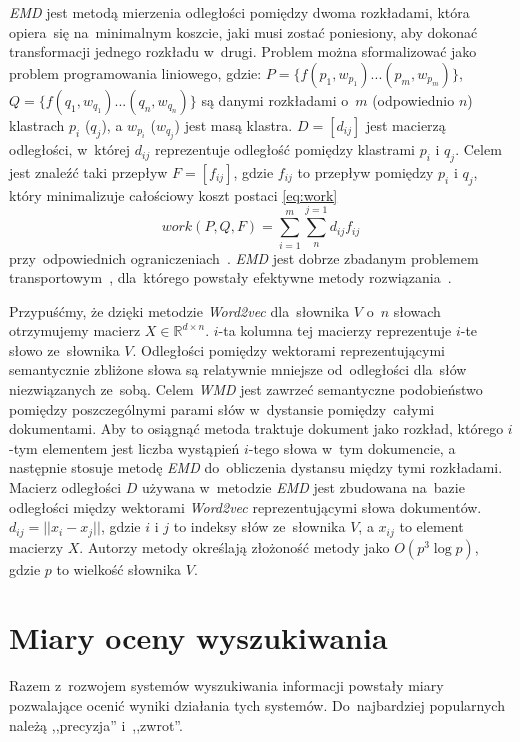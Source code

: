\documentclass[pl]{minipw} %
\begin{document}
\textit{EMD} jest metodą mierzenia odległości pomiędzy dwoma rozkładami, która opiera~się na~minimalnym koszcie, jaki musi zostać poniesiony, aby dokonać transformacji jednego rozkładu w~drugi. Problem można sformalizować jako problem programowania liniowego, gdzie:
$P=\{f(p_1,w_{p_1})...(p_m,w_{p_m})\}$, $Q=\{f(q_1,w_{q_1})...(q_n,w_{q_n})\}$ są danymi rozkładami o~$m$ (odpowiednio $n$) klastrach $p_i$ ($q_j$), a $w_{p_i}$ ($w_{q_j}$) jest masą klastra. $D=[d_{ij}]$ jest macierzą odległości, w~której $d_{ij}$ reprezentuje odległość pomiędzy klastrami $p_i$ i $q_j$. Celem jest znaleźć taki przepływ $F = [f_{ij}]$, gdzie $f_{ij}$ to przepływ pomiędzy $p_i$ i $q_j$, który minimalizuje całościowy koszt postaci \ref{eq:work}
\begin{equation}
\label{eq:work}
work(P, Q, F) = \sum_{i=1}^{m}\sum_{n}^{j=1}d_{ij}f_{ij}
\end{equation}
przy~odpowiednich ograniczeniach~\cite{emd}.
\textit{EMD} jest dobrze zbadanym problemem transportowym~\cite{emd}, dla~którego powstały efektywne metody rozwiązania~\cite{emd_method}. 

Przypuśćmy, że dzięki metodzie \textit{Word2vec} dla~słownika $V$ o~$n$ słowach otrzymujemy macierz $X \in \mathbb{R}^{d \times n}$. $i$-ta kolumna tej macierzy reprezentuje $i$-te słowo ze~słownika $V$. Odległości pomiędzy wektorami reprezentującymi semantycznie zbliżone słowa są relatywnie mniejsze od~odległości dla~słów niezwiązanych ze~sobą. Celem \textit{WMD} jest zawrzeć semantyczne podobieństwo pomiędzy poszczególnymi parami słów w~dystansie pomiędzy~całymi dokumentami. Aby to osiągnąć metoda traktuje dokument jako rozkład, którego $i$-tym elementem jest liczba wystąpień $i$-tego słowa w~tym dokumencie, a następnie stosuje metodę \textit{EMD} do~obliczenia dystansu między tymi rozkładami. Macierz odległości $D$ używana w~metodzie \textit{EMD} jest zbudowana na~bazie odległości między wektorami \textit{Word2vec} reprezentującymi słowa dokumentów. $d_{ij} = ||x_i-x_j||$, gdzie $i$ i $j$ to indeksy słów ze~słownika $V$, a $x_{ij}$ to element macierzy $X$. Autorzy metody określają złożoność metody jako $O(p^3\log p)$, gdzie $p$ to wielkość słownika $V$.

\section{Miary oceny wyszukiwania}

Razem z~rozwojem systemów wyszukiwania informacji powstały miary pozwalające ocenić wyniki działania tych systemów. Do~najbardziej popularnych należą ,,precyzja'' i~,,zwrot''.
\end{document}

